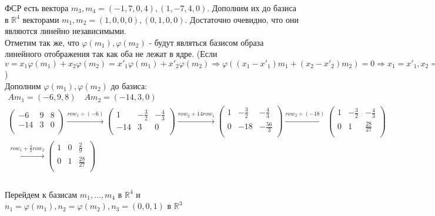 \documentclass[a4paper,11pt]{article}
\begin{document}
ФСР есть вектора $ m_3, m_4 = (-1, 7, 0, 4), (1, -7, 4, 0) $. Дополним их до базиса в $ \mathbb{R}^4 $ векторами $ m_1, m_2 = (1, 0, 0, 0), (0, 1, 0, 0) $.  Достаточно очевидно, что они являются линейно независимыми. \\[2pt]
Отметим так же, что $ \varphi(m_1), \varphi(m_2) $ - будут являться базисом образа линейного отображения так как оба не лежат в ядре. (Если $ v = x_1\varphi(m_1) + x_2\varphi(m_2) = x'_1\varphi(m_1) + x'_2\varphi(m_2) \Rightarrow \varphi((x_1 - x'_1)m_1 + (x_2 - x'_2)m_2) = 0 \Rightarrow x_1 = x'_1, x_2 = x'_2$ ) \\[2pt]
Дополним $ \varphi(m_1), \varphi(m_2) $ до базиса:
\begin{gather*}
Am_1 = (-6, 9, 8) \quad Am_2 = (-14, 3, 0) \\[2pt]
\begin{pmatrix}
-6 & 9 & 8 \\[2pt]
-14 & 3 & 0 \\[2pt]
\end{pmatrix}
\stackrel{ row_{1} \div (-6) }{\longrightarrow}
\begin{pmatrix}
1 & -\frac{3}{2} & -\frac{4}{3} \\[2pt]
-14 & 3 & 0 \\[2pt]
\end{pmatrix}
\stackrel{ row_{2} + 14row_{1} }{\longrightarrow}
\begin{pmatrix}
1 & -\frac{3}{2} & -\frac{4}{3} \\[2pt]
0 & -18 & -\frac{56}{3} \\[2pt]
\end{pmatrix}
\stackrel{ row_{2} \div (-18) }{\longrightarrow}
\begin{pmatrix}
1 & -\frac{3}{2} & -\frac{4}{3} \\[2pt]
0 & 1 & \frac{28}{27} \\[2pt]
\end{pmatrix}
\\[3pt]
\stackrel{ row_{1} + \frac{3}{2}row_{2} }{\longrightarrow}
\begin{pmatrix}
1 & 0 & \frac{2}{9} \\[2pt]
0 & 1 & \frac{28}{27} \\[2pt]
\end{pmatrix}
\\[3pt]
\end{gather*}
\\Перейдем к базисам $ m_1, \dots, m_4 $ в $ \mathbb{R}^4 $ и $ n_1 = \varphi(m_1), n_2 = \varphi(m_2), n_3 = (0, 0, 1) $ в $ \mathbb{R}^3 $ \\
\end{document}

